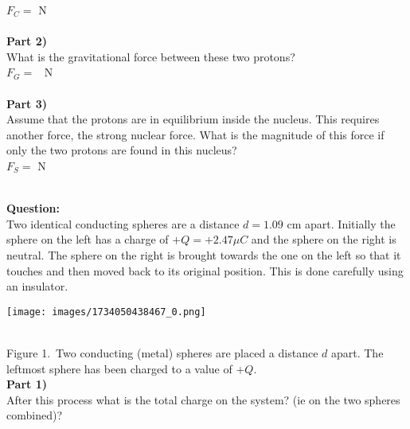 \documentclass[addpoints,12pt, margin-left=35px]{exam}
\begin{document}
$ F_C = $  \underline{\hspace{3cm}}  $\text{N}$ \\

\\

\textbf{Part 2)}\\

What is the gravitational force between these two protons?\\

$ F_G = $  \underline{\hspace{3cm}}  $\text{N}$ \\

\\

\textbf{Part 3)}\\

Assume that the protons are in equilibrium inside the nucleus. This requires another force, the strong nuclear force. What is the magnitude of this force if only the two protons are found in this nucleus?\\

$ F_S = $  \underline{\hspace{3cm}}  $\text{N}$ \\

\\

\newpage

\textbf{Question:}\\

Two identical conducting spheres are a distance $d = {1.09} \text{ cm}$ apart. Initially the sphere on the left has a charge of $+Q = + {2.47} \mu C$ and the sphere on the right is neutral. The sphere on the right is brought towards the one on the left so that it touches and then moved back to its original position. This is done carefully using an insulator.\\

\begin{center}
\texttt{[image: images/1734050438467\_0.png]}
\end{center}\\

Figure 1. Two conducting (metal) spheres are placed a distance $d$ apart. The leftmost sphere has been charged to a value of $+Q$.\\

\textbf{Part 1)}\\

After this process what is the total charge on the system? (ie on the two spheres combined)?\\
\end{document}

